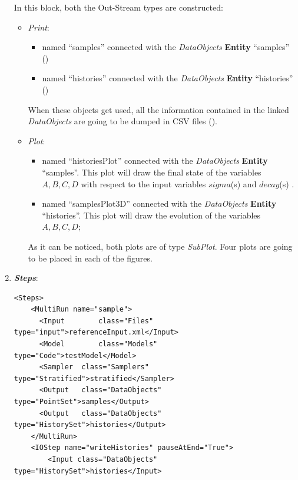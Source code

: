 \begin{enumerate}
\begin{figure}[h!]
  \label{fig:historiesStratifiedPlotLine}
 \end{figure}
  In this block, both the Out-Stream types are constructed: 
  \begin{itemize}
    \item \textit{Print}: 
     \begin{itemize}
       \item named ``samples'' connected with the \textit{DataObjects} \textbf{Entity} ``samples'' 
                ()
       \item named ``histories'' connected with the \textit{DataObjects} \textbf{Entity} ``histories'' ()          
     \end{itemize}         
      When these objects get used, all the information contained in the 
      linked  \textit{DataObjects} are going 
    to be dumped in CSV files ().
    \item \textit{Plot}: 
    \begin{itemize}
      \item named ``historiesPlot'' connected with the  \textit{DataObjects} 
      \textbf{Entity} ``samples''.  This plot will draw the final state of the
      variables $A,B,C,D$ with respect to the input variables $sigma$(s) 
      and $decay$(s) . 
      \item named ``samplesPlot3D'' connected with the  
      \textit{DataObjects} \textbf{Entity} ``histories''. This plot will draw the 
      evolution of the variables $A,B,C,D$;
    \end{itemize}
     As it can be noticed, both plots are of type \textit{SubPlot}. Four plots
     are going to be placed in each of the figures.
  \end{itemize}   
   \item \textbf{\textit{Steps}}:   
\begin{lstlisting}[style=XML,morekeywords={arg,extension,pauseAtEnd,overwrite}]
  <Steps>
    <MultiRun name="sample">
      <Input 	    class="Files" 			 type="input">referenceInput.xml</Input>
      <Model 	    class="Models" 		 type="Code">testModel</Model>
      <Sampler 	class="Samplers" 		 type="Stratified">stratified</Sampler>
      <Output 	class="DataObjects"  type="PointSet">samples</Output>
      <Output 	class="DataObjects"  type="HistorySet">histories</Output>
    </MultiRun>
    <IOStep name="writeHistories" pauseAtEnd="True">
        <Input class="DataObjects" type="HistorySet">histories</Input>

\end{lstlisting}
\end{enumerate}
